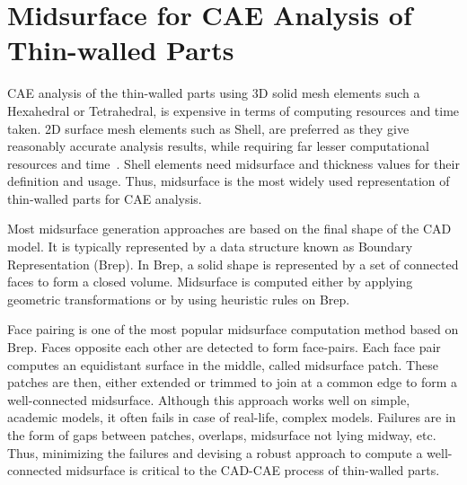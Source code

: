 \section{Midsurface for CAE Analysis of Thin-walled Parts} \label{sec:intro:cadcae}

CAE analysis of the thin-walled parts using 3D solid mesh elements such a Hexahedral or Tetrahedral, is expensive in terms of computing resources and time taken. 2D surface mesh elements such as Shell, are preferred as they give reasonably accurate analysis results, while requiring far lesser computational resources and time~\cite{Elangovan2012}.  Shell elements need midsurface and thickness values for their definition and usage. Thus, midsurface is the most widely used representation of thin-walled parts for CAE analysis.
 
 Most midsurface generation approaches are based on the final shape of the CAD model. It is typically represented by a data structure known as Boundary Representation (Brep). In Brep, a solid shape is represented by a set of connected faces to form a closed volume. Midsurface is computed either by applying geometric transformations or by using heuristic rules on Brep. 
 
Face pairing is one of the most popular midsurface computation method based on Brep. Faces opposite each other are detected to form face-pairs. Each face pair computes an equidistant surface in the middle, called midsurface patch. These patches are then, either extended or trimmed to join at a common edge to form a well-connected midsurface. Although this approach works well on simple, academic models, it often fails in case of real-life, complex models. Failures are in the form of gaps between patches, overlaps, midsurface not lying midway, etc.  Thus, minimizing the failures and devising a robust approach to compute a well-connected midsurface is critical to the CAD-CAE process of thin-walled parts.
 
